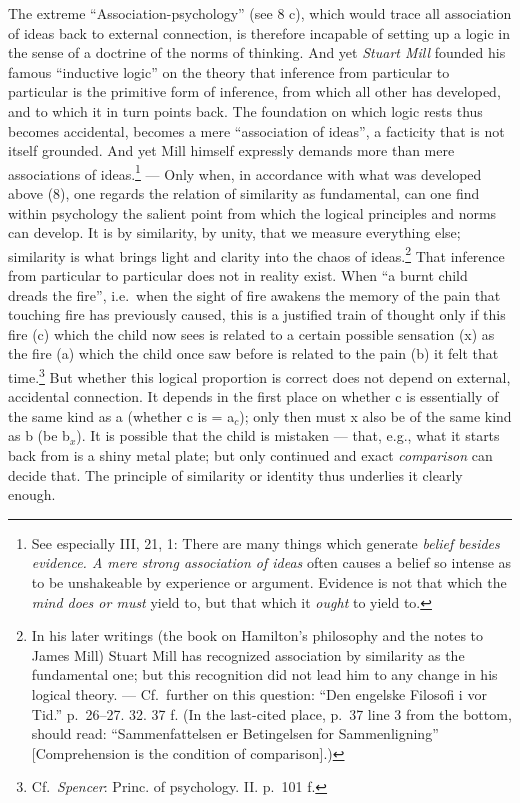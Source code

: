\documentclass[12pt,a4paper]{book}
\newcommand{\opage}[1]{\marginnote{\footnotesize\textit{[#1]}}}
\begin{document}
The extreme ``Association-psychology'' (see 8 c), which would trace all
association of ideas back to external connection, is therefore incapable
of setting up a logic in the sense of a doctrine of the norms of
thinking. And yet \emph{Stuart Mill} founded his famous ``inductive
logic'' on the theory that inference from particular to particular is
the primitive form of inference,
\opage{213}from which all other has developed, and to which it in turn
points back. The foundation on which logic rests thus becomes
accidental, becomes a mere ``association of ideas'', a facticity that is
not itself grounded. And yet Mill himself expressly demands more than
mere
associations of ideas.\footnote{See especially III, 21, 1: There are
many things which generate \emph{belief besides evidence. A mere strong
association of ideas} often causes a belief so intense as to be
unshakeable by experience or argument. Evidence is not that which the
\emph{mind does or must} yield to, but that which it \emph{ought} to
yield to.} --- Only when, in accordance with what was developed above
(8), one regards the relation of similarity as fundamental, can one find
within psychology the salient point from which the logical principles
and norms can develop. It is by similarity, by unity, that we measure
everything else; similarity is what brings light and clarity into the
chaos of ideas.\footnote{In his later writings (the book on Hamilton's
philosophy and the notes to James Mill) Stuart Mill has recognized
association by similarity as the fundamental one; but this recognition
did not lead him to any change in his logical theory. --- Cf.\ further
on this question: ``Den engelske Filosofi i vor Tid.'' p.~26--27. 32.
37 f. (In the last-cited place, p.~37 line 3 from the bottom, should
read: ``Sammenfattelsen er Betingelsen for Sammenligning''
[Comprehension is the condition of comparison].)}
That inference from particular to
particular does not in reality exist. When ``a burnt child dreads the
fire'', i.e.\ when the sight of fire awakens the memory of the pain that
touching fire has previously caused, this is a justified train of thought
only if this fire (c) which the child now sees is related to a certain
possible sensation (x) as the fire (a) which the child once saw before
is related to the pain (b) it felt
that time.\footnote{Cf.\ \emph{Spencer}: Princ. of psychology. II.
p.~101 f.} But whether this logical proportion is correct does not
depend on external, accidental connection. It depends in the first place
on whether c is essentially of the same kind as a (whether c is =
a$_{c}$); only then must x also be of the same kind as b (be b$_{x}$).
It is possible that the child is mistaken --- that, e.g., what it starts
back from is a shiny metal plate; but only continued and exact
\emph{comparison} can decide that. The principle of similarity or
identity thus underlies it clearly enough.
\end{document}
